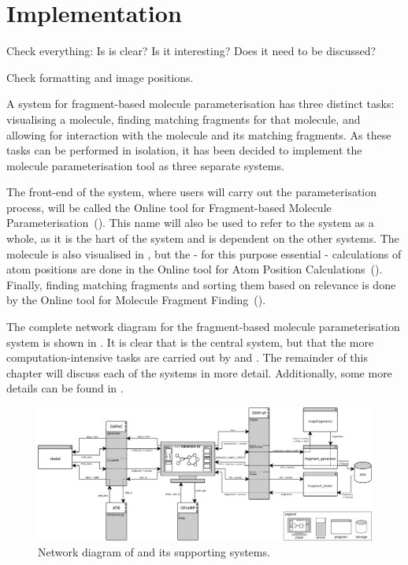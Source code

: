 \chapter{Implementation}


\setcounter{topnumber}{1}
\setcounter{bottomnumber}{1}
\setlength{\textfloatsep}{1em}
\renewcommand{\topfraction}{0.9}
\renewcommand{\bottomfraction}{0.9}
\renewcommand{\textfraction}{0.1}


\begin{todo}
\item Check everything: Is is clear? Is it interesting? Does it need to be discussed?
\item Check formatting and image positions.
\end{todo}

A system for fragment-based molecule parameterisation has three distinct tasks: visualising a molecule, finding matching fragments for that molecule, and allowing for interaction with the molecule and its matching fragments. As these tasks can be performed in isolation, it has been decided to implement the molecule parameterisation tool as three separate systems.

The front-end of the system, where users will carry out the parameterisation process, will be called the Online tool for Fragment-based Molecule Parameterisation~(\oframp). This name will also be used to refer to the system as a whole, as it is the hart of the system and is dependent on the other systems. The molecule is also visualised in \oframp, but the - for this purpose essential - calculations of atom positions are done in the Online tool for Atom Position Calculations~(\oapoc). Finally, finding matching fragments and sorting them based on relevance is done by the Online tool for Molecule Fragment Finding~(\omfraf).

The complete network diagram for the fragment-based molecule parameterisation system is shown in . It is clear that \oframp{} is the central system, but that the more computation-intensive tasks are carried out by \oapoc{} and \omfraf{}. The remainder of this chapter will discuss each of the systems in more detail. Additionally, some more details can be found in .


\begin{figure}
\center
\includegraphics[width=\textwidth]{img/network_diagram.pdf}
\vspace{1em}
\caption{Network diagram of \oframp{} and its supporting systems.}
\end{figure}



